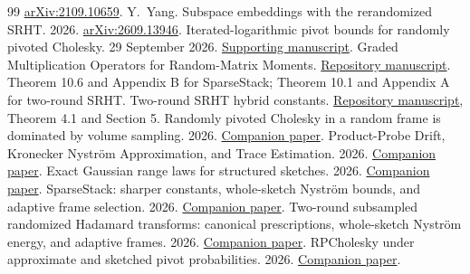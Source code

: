 \documentclass[11pt,a4paper]{article}
\begin{document}
\begin{thebibliography}{99}
\href{https://arxiv.org/abs/2109.10659}{arXiv:2109.10659}.
 Y.~Yang. Subspace embeddings with the rerandomized SRHT.
2026. \href{https://arxiv.org/abs/2609.13946}{arXiv:2609.13946}.
 Iterated-logarithmic pivot bounds for randomly pivoted
Cholesky. 29 September 2026.
\href{https://github.com/DiarHaidary/Results/blob/main/manuscripts/background/Iterated_Logarithmic_RPCholesky.pdf}{Supporting manuscript}.
 Graded Multiplication Operators for Random-Matrix Moments.
\href{https://github.com/DiarHaidary/Results/blob/main/Graded\%20Multiplication\%20Operators\%20for\%20Random-Matrix\%20Moments.pdf}{Repository manuscript}.
Theorem 10.6 and Appendix B for SparseStack; Theorem 10.1 and Appendix A
for two-round SRHT.
 Two-round SRHT hybrid constants.
\href{https://github.com/DiarHaidary/Results/blob/main/Wick-Hermite\%20Hybrid/srht_hybrid_constants_template.pdf}{Repository manuscript},
Theorem 4.1 and Section 5.
 Randomly pivoted Cholesky in a random frame is dominated by
volume sampling. 2026.
\href{https://github.com/DiarHaidary/Results/blob/main/manuscripts/01-Random-Frame-RPCholesky/Random_Frame_RPCholesky.pdf}{Companion paper}.
 Product-Probe Drift, Kronecker Nystr\"om Approximation, and
Trace Estimation. 2026.
\href{https://github.com/DiarHaidary/Results/blob/main/manuscripts/02-Product-Probe-Drift/Product_Probe_Drift_v2.pdf}{Companion paper}.
 Exact Gaussian range laws for structured sketches. 2026.
\href{https://github.com/DiarHaidary/Results/blob/main/manuscripts/03-Exact-Gaussian-Range-Laws/Exact_Gaussian_Range_Laws.pdf}{Companion paper}.
 SparseStack: sharper constants, whole-sketch Nystr\"om bounds,
and adaptive frame selection. 2026.
\href{https://github.com/DiarHaidary/Results/blob/main/manuscripts/04-SparseStack-Companion/SparseStack_Constants_Nystrom_Adaptive.pdf}{Companion paper}.
 Two-round subsampled randomized Hadamard transforms:
canonical prescriptions, whole-sketch Nystr\"om energy, and adaptive frames.
2026. \href{https://github.com/DiarHaidary/Results/blob/main/manuscripts/05-SRHT-Companion/SRHT_Prescriptions_Nystrom_Adaptive.pdf}{Companion paper}.
 RPCholesky under approximate and sketched pivot probabilities.
2026. \href{https://github.com/DiarHaidary/Results/blob/main/manuscripts/06-Robust-Sketched-RPCholesky/RPCholesky_Approximate_Sketched_Pivots.pdf}{Companion paper}.
\end{thebibliography}
\endgroup
\end{document}
